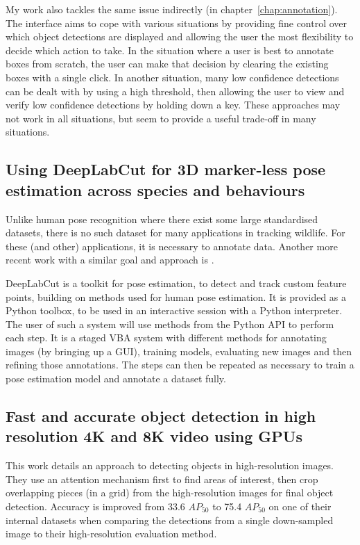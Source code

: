 My work also tackles the same issue indirectly (in chapter~\ref{chap:annotation}). The interface aims to cope with various situations by providing fine control over which object detections are displayed and allowing the user the most flexibility to decide which action to take. In the situation where a user is best to annotate boxes from scratch, the user can make that decision by clearing the existing boxes with a single click. In another situation, many low confidence detections can be dealt with by using a high threshold, then allowing the user to view and verify low confidence detections by holding down a key. These approaches may not work in all situations, but seem to provide a useful trade-off in many situations.

\subsection {Using DeepLabCut for 3D marker-less pose estimation across species and behaviours \cite{Nath2018, Mathis2018}}

Unlike human pose recognition where there exist some large standardised datasets, there is no such dataset for many applications in tracking wildlife. For these (and other) applications, it is necessary to annotate data. Another more recent work with a similar goal and approach is \cite{Graving2019}.

DeepLabCut is a toolkit for pose estimation, to detect and track custom feature points, building on methods used for human pose estimation. It is provided as a Python toolbox, to be used in an interactive session with a Python interpreter. The user of such a system will use methods from the Python \gls{API} to perform each step. It is a staged \gls{VBA} system with different methods for annotating images (by bringing up a GUI), training models, evaluating new images and then refining those annotations. The steps can then be repeated as necessary to train a pose estimation model and annotate a dataset fully. 

\subsection{Fast and accurate object detection in high resolution 4K and 8K video using GPUs \cite{Ruzicka2018}}

This work details an approach to detecting objects in high-resolution images. They use an attention mechanism first to find areas of interest, then crop overlapping pieces (in a grid) from the high-resolution images for final object detection. Accuracy is improved from 33.6 $AP_{50}$ to 75.4 $AP_{50}$ on one of their internal datasets when comparing the detections from a single down-sampled image to their high-resolution evaluation method. 

